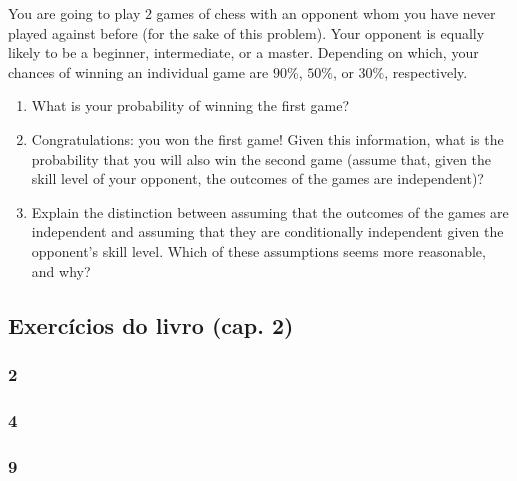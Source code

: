 \documentclass[
  11pt]{report}
\begin{document}
\begin{rmdbox}

You are going to play $2$ games of chess with an opponent whom you have never played against before (for the sake of this problem). Your opponent is equally likely to be a beginner, intermediate, or a master. Depending on which, your chances of winning an individual game are $90\%$, $50\%$, or $30\%$, respectively.

\begin{enumerate}
\def\labelenumi{\alph{enumi}.}
\item
  What is your probability of winning the first game?
\item
  Congratulations: you won the first game! Given this information, what is the probability that you will also win the second game (assume that, given the skill level of your opponent, the outcomes of the games are independent)?
\item
  Explain the distinction between assuming that the outcomes of the games are independent and assuming that they are conditionally independent given the opponent's skill level. Which of these assumptions seems more reasonable, and why?
\end{enumerate}

\end{rmdbox}

\hypertarget{exercuxedcios-do-livro-cap.-2}{%
\subsection*{Exercícios do livro (cap. 2)}\label{exercuxedcios-do-livro-cap.-2}}

\hypertarget{section-10}{%
\subsubsection*{2}\label{section-10}}

\hypertarget{section-11}{%
\subsubsection*{4}\label{section-11}}

\hypertarget{section-12}{%
\subsubsection*{9}\label{section-12}}
\end{document}
